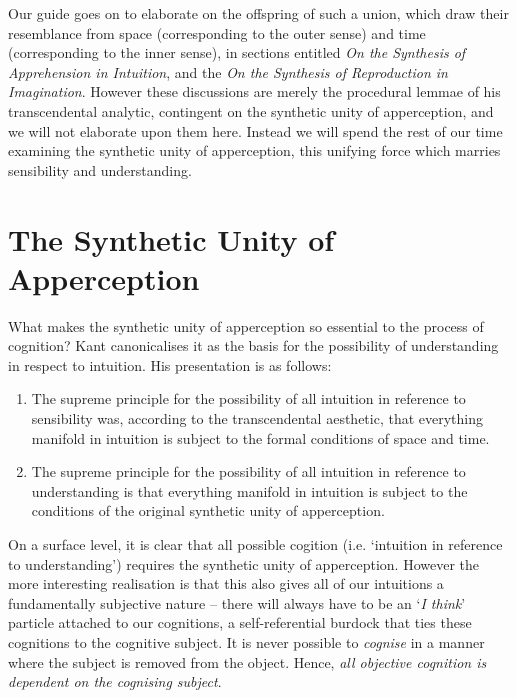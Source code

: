 \noindent
Our guide goes on to elaborate on the offspring of such a union, which draw their resemblance from space (corresponding to the outer sense) and time (corresponding to the inner sense), in sections entitled \emph{On the Synthesis of Apprehension in Intuition}, and the \emph{On the Synthesis of Reproduction in Imagination}. However these discussions are merely the procedural lemmae of his transcendental analytic, contingent on the synthetic unity of apperception, and we will not elaborate upon them here. Instead we will spend the rest of our time examining the synthetic unity of apperception, this unifying force which marries sensibility and understanding.

\section*{The Synthetic Unity of Apperception}
What makes the synthetic unity of apperception so essential to the process of cognition? Kant canonicalises it as the basis for the possibility of understanding in respect to intuition. His presentation is as follows:

\begin{enumerate}
  \item The supreme principle for the possibility of all intuition in reference to sensibility was, according to the transcendental aesthetic, that everything manifold in intuition is subject to the formal conditions of space and time.
  \item The supreme principle for the possibility of all intuition in reference to understanding is that everything manifold in intuition is subject to the conditions of the original synthetic unity of apperception.

  \autocite[B137]{hackett}
\end{enumerate}

\noindent
On a surface level, it is clear that all possible cogition (i.e. `intuition in reference to understanding') requires the synthetic unity of apperception. However the more interesting realisation is that this also gives all of our intuitions a fundamentally subjective nature -- there will always have to be an `\emph{I think}' particle attached to our cognitions, a self-referential burdock that ties these cognitions to the cognitive subject. It is never possible to \emph{cognise} in a manner where the subject is removed from the object. Hence, \emph{all objective cognition is dependent on the cognising subject}.

